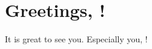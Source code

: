 \documentclass{article}
\begin{document}
\section{Greetings, {}!}
It is great to see you.
Especially you, {}!
\end{document}
